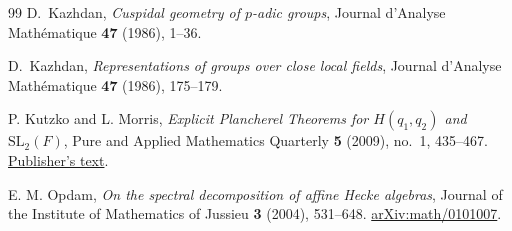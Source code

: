 \documentclass[11pt,a4paper]{amsart}
\theoremstyle{definition}
\theoremstyle{remark}
\begin{document}
\begin{thebibliography}{99}
D.~Kazhdan, {\em Cuspidal geometry of \(p\)-adic groups}, Journal d'Analyse Math\'ematique {\bf 47} (1986), 1--36.

D.~Kazhdan, \emph{Representations of groups over close local fields},
Journal d'Analyse Math\'ematique \textbf{47} (1986), 175--179.

P. Kutzko and L. Morris,
\emph{Explicit Plancherel Theorems for $H(q_1,q_2)$ and
$\mathrm{SL}_2(F)$},
Pure and Applied Mathematics Quarterly \textbf{5} (2009),
no.~1, 435--467.
\href{https://archive.intlpress.com/site/pub/files/_fulltext/journals/pamq/2009/0005/0001/PAMQ-2009-0005-0001-a013.pdf}{Publisher's text}.

E. M. Opdam,
\emph{On the spectral decomposition of affine Hecke algebras},
Journal of the Institute of Mathematics of Jussieu \textbf{3} (2004),
531--648.
\href{https://arxiv.org/abs/math/0101007}{arXiv:math/0101007}.
\end{thebibliography}
\end{document}
